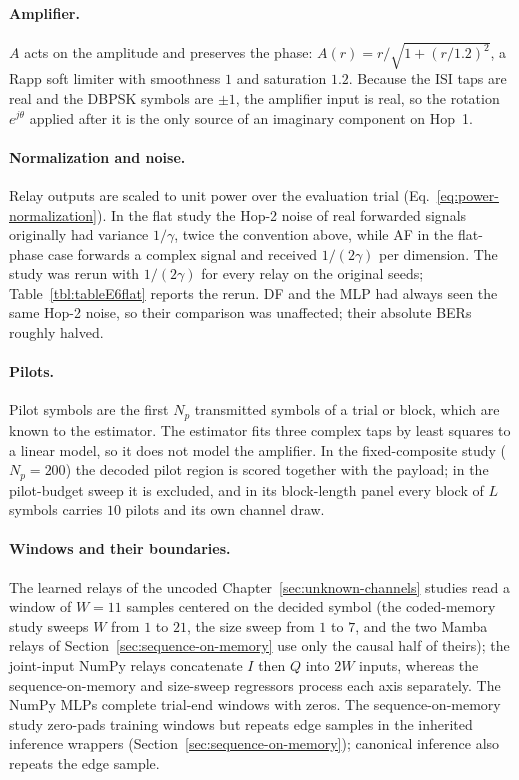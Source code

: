 \paragraph{Amplifier.} $A$ acts on the amplitude and preserves the phase: $A(r) = r/\sqrt{1 + (r/1.2)^{2}}$, a Rapp soft limiter with smoothness $1$ and saturation $1.2$. Because the ISI taps are real and the DBPSK symbols are $\pm1$, the amplifier input is real, so the rotation $e^{j\theta}$ applied after it is the only source of an imaginary component on Hop~1.

\paragraph{Normalization and noise.} Relay outputs are scaled to unit power over the evaluation trial (Eq.~\eqref{eq:power-normalization}). In the flat study the Hop-2 noise of real forwarded signals originally had variance $1/\gamma$, twice the convention above, while AF in the flat-phase case forwards a complex signal and received $1/(2\gamma)$ per dimension. The study was rerun with $1/(2\gamma)$ for every relay on the original seeds; Table~\ref{tbl:tableE6flat} reports the rerun. DF and the MLP had always seen the same Hop-2 noise, so their comparison was unaffected; their absolute BERs roughly halved.

\paragraph{Pilots.} Pilot symbols are the first $N_p$ transmitted symbols of a trial or block, which are known to the estimator. The estimator fits three complex taps by least squares to a linear model, so it does not model the amplifier. In the fixed-composite study ($N_p = 200$) the decoded pilot region is scored together with the payload; in the pilot-budget sweep it is excluded, and in its block-length panel every block of $L$ symbols carries $10$ pilots and its own channel draw.

\paragraph{Windows and their boundaries.} The learned relays of the uncoded Chapter~\ref{sec:unknown-channels} studies read a window of $W = 11$ samples centered on the decided symbol (the coded-memory study sweeps $W$ from $1$ to $21$, the size sweep from $1$ to $7$, and the two Mamba relays of Section~\ref{sec:sequence-on-memory} use only the causal half of theirs); the joint-input NumPy relays concatenate $I$ then $Q$ into $2W$ inputs, whereas the sequence-on-memory and size-sweep regressors process each axis separately. The NumPy MLPs complete trial-end windows with zeros. The sequence-on-memory study zero-pads training windows but repeats edge samples in the inherited inference wrappers (Section~\ref{sec:sequence-on-memory}); canonical inference also repeats the edge sample.

